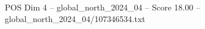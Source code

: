 \begin{textsample}{POS Dim 4 – global\_north\_2024\_04 – Score 18.00 – global\_north\_2024\_04/107346534.txt}
\end{textsample}
